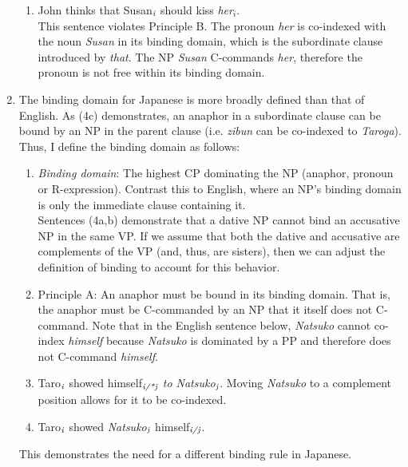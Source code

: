 \documentclass[12pt]{article}
\begin{document}
\begin{enumerate}
\begin{enumerate}[label=\arabic*]
\item John thinks that Susan$_{\emph{i}}$ should kiss \emph{her$_{i}$}.\\
This sentence violates Principle B. The pronoun \emph{her} is co-indexed with the noun \emph{Susan} in its binding domain, which is the subordinate clause introduced by \emph{that}. The NP \emph{Susan} C-commands \emph{her}, therefore the pronoun is not free within its binding domain.
\end{enumerate}
\item The binding domain for Japanese is more broadly defined than that of English. As (4c) demonstrates, an anaphor in a subordinate clause can be bound by an NP in the parent clause (i.e. \emph{zibun} can be co-indexed to \emph{Taroga}). Thus, I define the binding domain as follows:
\begin{enumerate}
\item \emph{Binding domain}: The highest CP dominating the NP (anaphor, pronoun or R-expression).
Contrast this to English, where an NP's binding domain is only the immediate clause containing it.\\
Sentences (4a,b) demonstrate that a dative NP cannot bind an accusative NP in the same VP. If we assume that both the dative and accusative are complements of the VP (and, thus, are sisters), then we can adjust the definition of binding to account for this behavior.
\item Principle A: An anaphor must be bound in its binding domain. That is, the anaphor must be C-commanded by an NP that it itself does not C-command.
Note that in the English sentence below, \emph{Natsuko} cannot co-index \emph{himself} because \emph{Natsuko} is dominated by a PP and therefore does not C-command \emph{himself}.
\item Taro$_{\emph{i}}$ showed himself$_{\emph{i/*j}}$ \emph{to Natsuko}$_{\emph{j}}$.
Moving \emph{Natsuko} to a complement position allows for it to be co-indexed.
\item Taro$_{\emph{i}}$ showed \emph{Natsuko}$_{\emph{j}}$ himself$_{\emph{i/j}}$.
\end{enumerate}
This demonstrates the need for a different binding rule in Japanese.
\end{enumerate}
\end{document}
